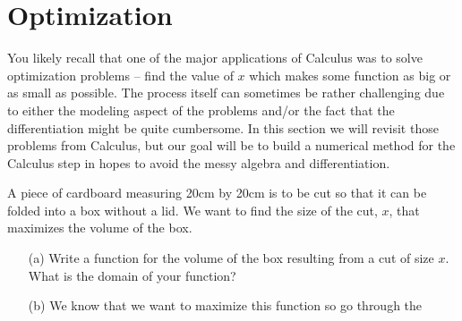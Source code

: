 \newpage\section{Optimization}
You likely recall that one of the major applications of Calculus was to solve optimization
problems -- find the value of $x$ which makes some function as big or as small as
possible.  The process itself can sometimes be rather challenging due to either the
modeling aspect of the problems and/or the fact that the differentiation might be
quite cumbersome.  In this section we will revisit those problems from Calculus, but our
goal will be to build a numerical method for the Calculus step in hopes to avoid the messy
algebra and differentiation.

\begin{problem}\label{prob:cardboard}
    A piece of cardboard measuring 20cm by 20cm is to be cut so that it can be folded into
    a box without a lid. We want to find the size of the cut, $x$, that maximizes the
    volume of the box. 
    \begin{center}
    \end{center}
    \begin{enumerate}
        \item[(a)] Write a function for the volume of the box resulting from a cut of size
            $x$.  What is the domain of your function?
        \item[(b)] We know that we want to maximize this function so go through the

\end{enumerate}
\end{problem}
